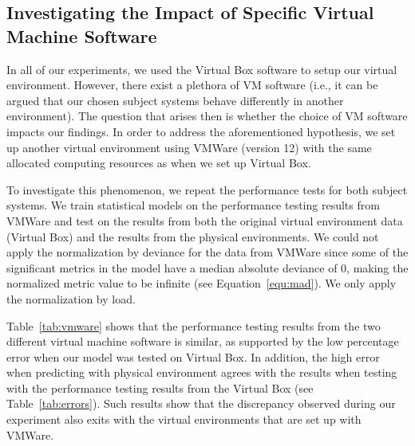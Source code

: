 \subsection{Investigating the Impact of Specific Virtual Machine Software}

In all of our experiments, we used the Virtual Box software to setup our virtual environment. However, there exist a plethora of VM software (i.e., it can be argued that our chosen subject systems behave differently in another environment). The question that arises then is whether the choice of VM software impacts our findings. In order to address the aforementioned hypothesis, we set up another virtual environment using VMWare (version 12) with the same allocated computing resources as when we set up Virtual Box.

To investigate this phenomenon, we repeat the performance tests for both subject systems. We train statistical models on the performance testing results from VMWare and test on the results from both the original virtual environment data (Virtual Box) and the results from the physical environments. We could not apply the normalization by deviance for the data from VMWare since some of the significant metrics in the model have a median absolute deviance of 0, making the normalized metric value to be infinite (see Equation~\ref{equ:mad}). We only apply the normalization by load. 

Table~\ref{tab:vmware} shows that the performance testing results from the two different virtual machine software is similar, as supported by the low percentage error when our model was tested on Virtual Box. In addition, the high error when predicting with physical environment agrees with the results when testing with the performance testing results from the Virtual Box (see Table~\ref{tab:errors}). Such results show that the discrepancy observed during our experiment also exits with the virtual environments that are set up with VMWare.

\begin{table}[tbh]
	\centering
	\caption{Median absolute percentage error from building a model using VMWare data.}
	\label{tab:vmware}
	\end{table}
	
